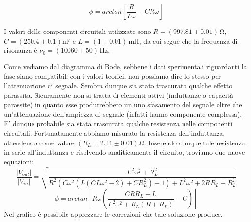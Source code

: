\begin{equation}
\phi=arctan\left[\frac{R}{L \omega}-C R \omega \right]
\label{eq:bpfPhi}
\end{equation}

\noindent I valori delle componenti circuitali utilizzate sono $R=(997.81 \pm 0.01)\,\si{\ohm}$, $C=(250.4 \pm 0.1)\si{\nano\farad}$ e $L=(1 \pm 0.01)\,\si{\milli\henry}$, da cui segue che la frequenza di risonanza è $\nu_0 = (10060 \pm 50)\,\si{\hertz}$.

Come vediamo dal diagramma di Bode, sebbene i dati sperimentali riguardanti la fase siano compatibili con i valori teorici, non possiamo dire lo stesso per l'attenuazione di segnale. Sembra dunque sia stato trascurato qualche effetto parassita. Sicuramente non si tratta di elementi attivi (induttanze o capacità parassite) in quanto esse produrrebbero un uno sfasamento del segnale oltre che un'attenuazione dell'ampiezza di segnale (infatti hanno componente complessa). E' dunque probabile sia stata trascurata qualche resistenza nelle componenti circuitali. Fortunatamente abbiamo misurato la resistenza dell'induttanza, ottendendo come valore $(R_L=2.41\pm 0.01) \Omega$. Inserendo dunque tale resistenza in serie all'induttanza e risolvendo analiticamente il circuito, troviamo due nuove equazioni:\\

\noindent
\begin{equation}
\frac{|V_{out}|}{|V_{in}|}=\sqrt{\frac{L^2 \omega ^2+R_L^2}{R^2 \left(C \omega ^2 \left(L \left(C L \omega ^2-2\right)+C R_L^2\right)+1\right)+L^2 \omega ^2+2 R R_L+R_L^2}}
\label{bpfGain_corr}
\end{equation}
\begin{equation}
\phi=arctan\left[R \omega \left(\frac{C R R_L+L}{L^2 \omega ^2+R_L (R+R_L)}-C\right)\right]
\label{bpfPhi_corr}
\end{equation}
\break
\noindent Nel grafico è possibile apprezzare le correzioni che tale soluzione produce.